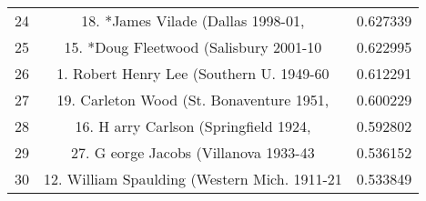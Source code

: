 \documentclass{mcmthesis}
\begin{document}
\begin{appendices}
\begin{longtable}{ccc}
    24    & 18. *James Vilade (Dallas 1998-01, & 0.627339 \\
    25    & 15. *Doug Fleetwood (Salisbury 2001-10 & 0.622995 \\
    26    & 1. Robert Henry Lee (Southern U. 1949-60 & 0.612291 \\
    27    & 19. Carleton Wood (St. Bonaventure 1951, & 0.600229 \\
    28    & 16. H arry Carlson (Springfield 1924, & 0.592802 \\
    29    & 27. G eorge Jacobs (Villanova 1933-43 & 0.536152 \\
    30    & 12. William Spaulding (Western Mich. 1911-21 & 0.533849 \\
\end{longtable}




\end{appendices}
\end{document}
